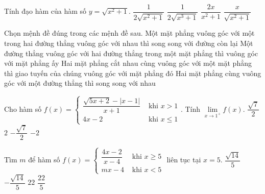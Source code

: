 \begin{ex}%
	Tính đạo hàm của hàm số $y=\sqrt{x^2+1}.$
	\choice
	{$\dfrac{1}{2\sqrt{x^2+1}}$}
	{$\dfrac{1}{2\sqrt{x^3+1}}$}
	{$\dfrac{2x}{x^2+1}$}
	{\True $\dfrac{x}{\sqrt{x^2+1}}$}
\end{ex}

\begin{ex}%
	Chọn mệnh đề đúng trong các mệnh đề sau.
	\choice
	{Một mặt phẳng vuông góc với một trong hai đường thẳng vuông góc với nhau thì song song với đường còn lại}
	{Một đường thẳng vuông góc với hai đường thẳng trong một mặt phẳng thì vuông góc với mặt phẳng ấy}
	{\True Hai mặt phẳng cắt nhau cùng vuông góc với một mặt phẳng thì giao tuyến của chúng vuông góc với mặt phẳng đó}
	{Hai mặt phẳng cùng vuông góc với một đường thẳng thì song song với nhau}
	\loigiai{
		
	}
\end{ex} 

\begin{ex}%
	Cho hàm số $f(x)=\begin{cases}
	\dfrac{\sqrt{5x+2}-|x-1|}{x+1} &\text{ khi } x>1\\
	4x-2 &\text{ khi } x \leq 1
	\end{cases}.$ Tính $\lim\limits_{x \rightarrow 1^{+}}f(x).$
	\choice
	{\True $\dfrac{\sqrt{7}}{2}$}
	{$2$}
	{$-\dfrac{\sqrt{7}}{2}$}
	{$-2$}
\end{ex}

\begin{ex}%
	Tìm $m$ để hàm số $f(x)=\begin{cases}
	\dfrac{4x-2}{x-4} &\text{ khi } x \geq 5 \\
	mx-4 &\text{ khi } x<5
	\end{cases}$ liên tục tại $x=5.$
	\choice
	{$\dfrac{\sqrt{14}}{5}$}
	{$-\dfrac{\sqrt{14}}{5}$}
	{$22$}
	{\True $\dfrac{22}{5}$}
\end{ex}



